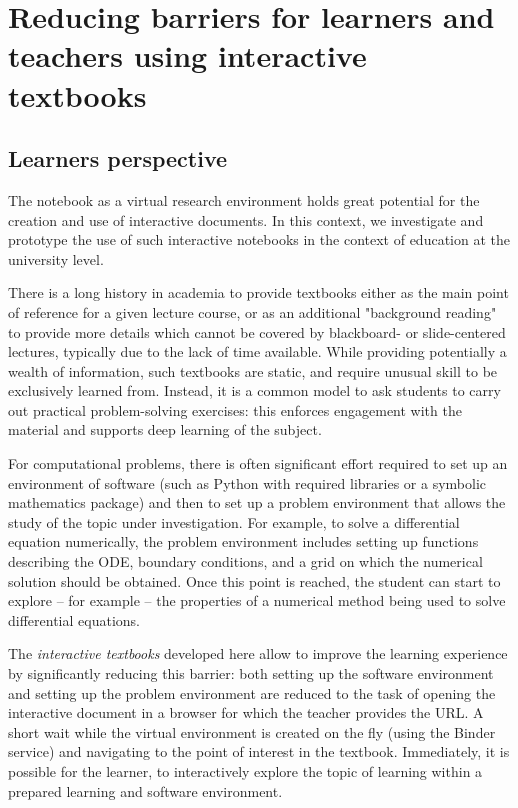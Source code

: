 \documentclass{deliverablereport}
\begin{document}
\section{Reducing barriers for learners and teachers using interactive textbooks}



\subsection{Learners perspective}

The \Jupyter notebook as a virtual research environment holds great
potential for the creation and use of interactive documents. In this
context, we investigate and prototype the use of such interactive
notebooks in the context of education at the university level.

There is a long history in academia to provide textbooks either as
the main point of reference for a given lecture course, or as an
additional "background reading" to provide more details which cannot
be covered by blackboard- or slide-centered lectures, typically due to
the lack of time available.
%
While providing potentially a wealth of information, such textbooks
are static, and require unusual skill to be exclusively learned
from. Instead, it is a common model to ask students to carry out
practical problem-solving exercises: this enforces engagement with the
material and supports deep learning of the subject.

For computational problems, there is often significant effort required
to set up an environment of software (such as Python with required
libraries or a symbolic mathematics package) and then to set up a
problem environment that allows the study of the topic under
investigation. For example, to solve a differential equation
numerically, the problem environment includes setting up functions
describing the ODE, boundary conditions, and a grid on which the
numerical solution should be obtained. Once this point is reached, the
student can start to explore -- for example -- the properties of a
numerical method being used to solve differential equations.

The \emph{interactive textbooks} developed here allow to improve the
learning experience by significantly reducing this barrier: both
setting up the software environment and setting up the problem
environment are reduced to the task of opening the interactive
document in a browser for which the teacher provides the URL. A short
wait while the virtual environment is created on the fly (using the
Binder service) and navigating to the point of interest in the
textbook. Immediately, it is possible for the learner, to
interactively explore the topic of learning within a prepared learning
and software environment.
\end{document}
